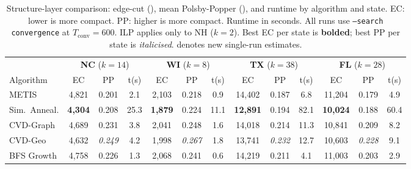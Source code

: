 \begin{table}[ht]
\centering
\caption{%
  Structure-layer comparison: edge-cut (\ec{}), mean Polsby-Popper (\pp{}),
  and runtime by algorithm and state.
  EC: lower is more compact. PP: higher is more compact. Runtime in seconds.
  All runs use \texttt{--search convergence} at $T_{\mathrm{conv}} = 600$.
  ILP applies only to NH ($k = 2$).
  Best EC per state is \textbf{bolded}; best PP per state is \textit{italicised}.
  \dag{} denotes new single-run estimates.
}
\label{tab:structure}
\small
\begin{tabular}{@{}lcccccccccccc@{}}
\toprule
 & \multicolumn{3}{c}{\textbf{NC} ($k=14$)}
 & \multicolumn{3}{c}{\textbf{WI} ($k=8$)}
 & \multicolumn{3}{c}{\textbf{TX} ($k=38$)}
 & \multicolumn{3}{c}{\textbf{FL} ($k=28$)\dag{}} \\
\cmidrule(lr){2-4}\cmidrule(lr){5-7}\cmidrule(lr){8-10}\cmidrule(lr){11-13}
Algorithm & EC & PP & t(s) & EC & PP & t(s) & EC & PP & t(s) & EC & PP & t(s) \\
\midrule
METIS          & 4{,}821 & 0.201 &  2.1
               & 2{,}103 & 0.218 &  0.9
               & 14{,}402 & 0.187 &  6.8
               & \dag{}11{,}204 & \dag{}0.179 & \dag{} 4.9 \\
Sim.\ Anneal.  & \textbf{4{,}304} & 0.208 & 25.3
               & \textbf{1{,}879} & 0.224 & 11.1
               & \textbf{12{,}891} & 0.194 & 82.1
               & \dag{}\textbf{10{,}024} & \dag{}0.188 & \dag{}60.4 \\
CVD-Graph      & 4{,}689 & 0.231 &  3.8
               & 2{,}041 & 0.248 &  1.6
               & 14{,}018 & 0.214 & 11.3
               & \dag{}10{,}841 & \dag{}0.209 & \dag{} 8.2 \\
CVD-Geo        & 4{,}632 & \textit{0.249} &  4.2
               & 1{,}998 & \textit{0.267} &  1.8
               & 13{,}741 & \textit{0.232} & 12.7
               & \dag{}10{,}603 & \dag{}\textit{0.228} & \dag{} 9.1 \\
BFS Growth     & 4{,}758 & 0.226 &  1.3
               & 2{,}068 & 0.241 &  0.6
               & 14{,}219 & 0.211 &  4.1
               & \dag{}11{,}003 & \dag{}0.203 & \dag{} 2.9 \\
\bottomrule
\end{tabular}
\end{table}

